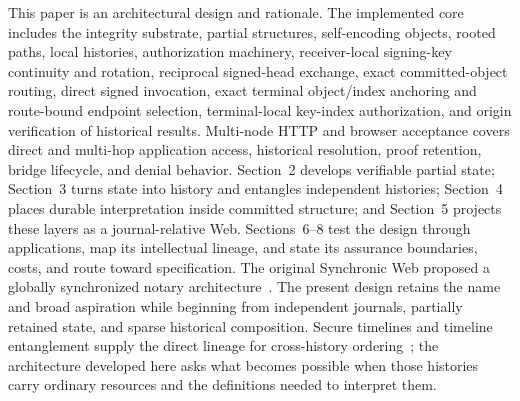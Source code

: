 This paper is an architectural design and rationale. The implemented core includes the integrity substrate, partial structures, self-encoding objects, rooted paths, local histories, authorization machinery, receiver-local signing-key continuity and rotation, reciprocal signed-head exchange, exact committed-object routing, direct signed invocation, exact terminal object/index anchoring and route-bound endpoint selection, terminal-local key-index authorization, and origin verification of historical results. Multi-node HTTP and browser acceptance covers direct and multi-hop application access, historical resolution, proof retention, bridge lifecycle, and denial behavior. Section~2 develops verifiable partial state; Section~3 turns state into history and entangles independent histories; Section~4 places durable interpretation inside committed structure; and Section~5 projects these layers as a journal-relative Web. Sections~6--8 test the design through applications, map its intellectual lineage, and state its assurance boundaries, costs, and route toward specification. The original Synchronic Web proposed a globally synchronized notary architecture~\cite{dinh2023synchronic}. The present design retains the name and broad aspiration while beginning from independent journals, partially retained state, and sparse historical composition. Secure timelines and timeline entanglement supply the direct lineage for cross-history ordering~\cite{Maniatis2002timeline}; the architecture developed here asks what becomes possible when those histories carry ordinary resources and the definitions needed to interpret them.